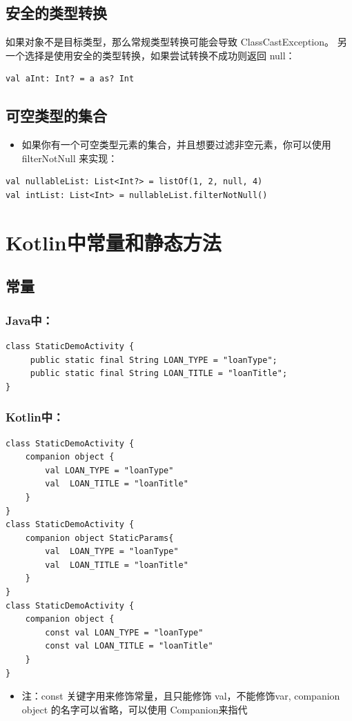 \documentclass[9pt, b5paper]{article}
\begin{document}
\subsection{安全的类型转换}
\label{sec-1-6}
如果对象不是目标类型，那么常规类型转换可能会导致 ClassCastException。 另一个选择是使用安全的类型转换，如果尝试转换不成功则返回 null：
\begin{verbatim}
val aInt: Int? = a as? Int
\end{verbatim}

\subsection{可空类型的集合}
\label{sec-1-7}
\begin{itemize}
\item 如果你有一个可空类型元素的集合，并且想要过滤非空元素，你可以使用 filterNotNull 来实现：
\end{itemize}
\begin{verbatim}
val nullableList: List<Int?> = listOf(1, 2, null, 4)
val intList: List<Int> = nullableList.filterNotNull()
\end{verbatim}
\section{Kotlin中常量和静态方法}
\label{sec-2}
\subsection{常量}
\label{sec-2-1}
\subsubsection{Java中：}
\label{sec-2-1-1}
\begin{verbatim}
class StaticDemoActivity {
     public static final String LOAN_TYPE = "loanType";
     public static final String LOAN_TITLE = "loanTitle";
}
\end{verbatim}
\subsubsection{Kotlin中：}
\label{sec-2-1-2}
\begin{verbatim}
class StaticDemoActivity {
    companion object {
        val LOAN_TYPE = "loanType"
        val  LOAN_TITLE = "loanTitle"
    }
}
class StaticDemoActivity {
    companion object StaticParams{
        val  LOAN_TYPE = "loanType"
        val  LOAN_TITLE = "loanTitle"
    }
}
class StaticDemoActivity {
    companion object {
        const val LOAN_TYPE = "loanType"
        const val LOAN_TITLE = "loanTitle"
    }
}
\end{verbatim}
\begin{itemize}
\item 注：const 关键字用来修饰常量，且只能修饰 val，不能修饰var, companion object 的名字可以省略，可以使用 Companion来指代
\end{itemize}
\end{document}
